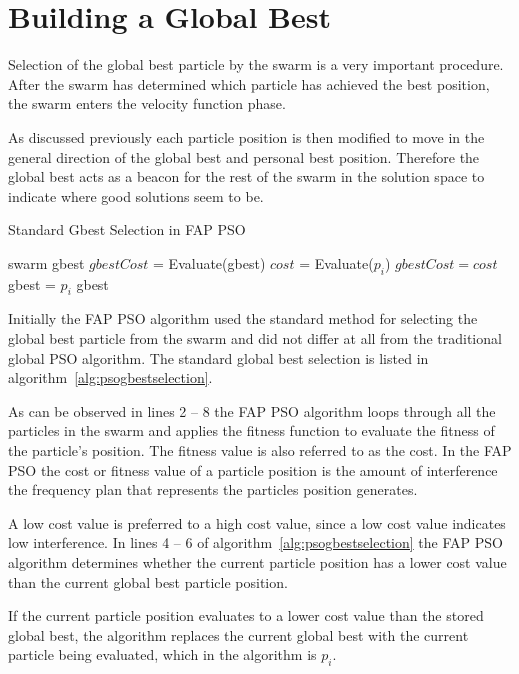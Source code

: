 \section{Building a Global Best}
\label{sec:buildglobalbest}
Selection of the global best particle by the swarm is a very important procedure. After the swarm has determined which particle has achieved the best position, the swarm enters the velocity function phase. 

As discussed previously each particle position is then modified to move in the general direction of the global best and personal best position. Therefore the global best acts as a beacon for the rest of the swarm in the solution space to indicate where good solutions seem to be.

\begin{algorithm}
\caption{Standard Gbest Selection in FAP PSO }
\label{alg:psogbestselection}
\begin{algorithmic}[1]
\Require swarm
\Require gbest
\State $gbestCost$ = Evaluate(gbest)
	\State $cost$ = Evaluate($p_i$)
		\State $gbestCost = cost$
		\State gbest = $p_i$
	\EndIf
\EndFor
\Return gbest
\end{algorithmic}
\end{algorithm}

Initially the \gls{FAP} \gls{PSO} algorithm used the standard method for selecting the global best particle from the swarm and did not differ at all from the traditional global \gls{PSO} algorithm. The standard global best selection is listed in algorithm~\ref{alg:psogbestselection}. 

As can be observed in lines 2 -- 8 the \gls{FAP} \gls{PSO} algorithm loops through all the particles in the swarm and applies the fitness function to evaluate the fitness of the particle's position. The fitness value is also referred to as the cost. In the \gls{FAP} \gls{PSO} the cost or fitness value of a particle position is the amount of interference the frequency plan that represents the particles position generates.

A low cost value is preferred to a high cost value, since a low cost value indicates low interference. In lines 4 -- 6 of algorithm~\ref{alg:psogbestselection} the \gls{FAP} \gls{PSO} algorithm determines whether the current particle position has a lower cost value than the current global best particle position.

If the current particle position evaluates to a lower cost value than the stored global best, the algorithm replaces the current global best with the current particle being evaluated, which in the algorithm is $p_i$.

